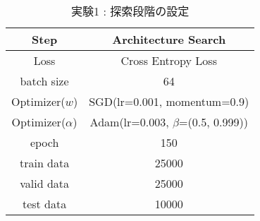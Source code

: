 
\begin{table}[tb]
  \begin{center}
    \caption{実験1 : 探索段階の設定}
  	\vspace{3mm}
    \begin{tabular}{|c|c|} \hline
      Step & Architecture Search \\ \hline\hline
      Loss & Cross Entropy Loss \\ \hline
      batch size & 64 \\ \hline
      Optimizer($w$) & SGD(lr=0.001, momentum=0.9) \\ \hline
      Optimizer($\alpha$) & Adam(lr=0.003, $\beta$=(0.5, 0.999)) \\ \hline
      epoch & 150\\ \hline
      train data & 25000\\ \hline
      valid data & 25000\\ \hline
      test data &  10000\\ \hline
    \end{tabular}
    \label{tab:setting_exp}
  \end{center}
\end{table}

